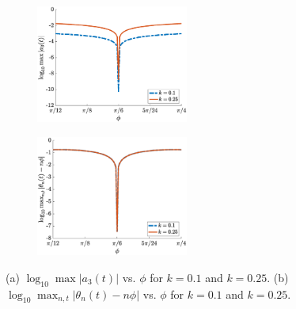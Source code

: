 \documentclass[11pt,reqno]{amsart}
\begin{document}
\begin{figure}
    \centering
    \begin{subfigure}{0.4\linewidth}
        \caption{}
        \label{fig:m6suppa3}
        \includegraphics[width=5cm]{a3phicont.eps}
    \end{subfigure}
    \begin{subfigure}{0.4\linewidth}
        \caption{}
        \label{fig:m6supptheta}
        \includegraphics[width=5cm]{thetaphicont.eps}
    \end{subfigure}
    \caption{(a) $\log_{10} \max |a_3(t)|$ vs. $\phi$ for $k=0.1$ and $k=0.25$. (b) $\log_{10} \max_{n,t}{|\theta_n(t) - n \phi|}$ vs. $\phi$ for $k=0.1$ and $k=0.25$.}
    \label{fig:m6supp}
\end{figure}
\end{document}
